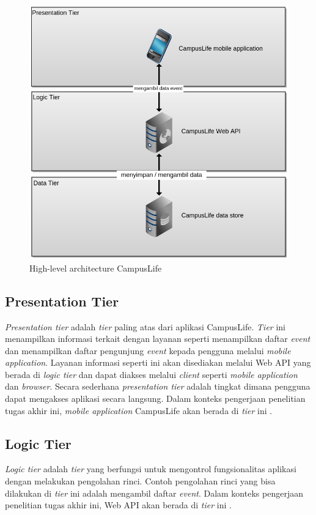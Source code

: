 \documentclass[a4paper, 12pt, oneside]{report}
\begin{document}
\begin{figure}[htp]
\centering
\includegraphics[scale=0.40]{images/test.png}
\caption{High-level architecture CampusLife}
\label{high-level-architecture-cl}
\end{figure}

\subsection{Presentation Tier}
\onehalfspacing \textit{Presentation tier} adalah \textit{tier} paling atas dari aplikasi CampusLife. \textit{Tier} ini menampilkan informasi terkait dengan layanan seperti menampilkan daftar \textit{event} dan menampilkan daftar pengunjung \textit{event} kepada pengguna melalui \textit{mobile application}. Layanan informasi seperti ini akan disediakan melalui Web API yang berada di \textit{logic tier} dan dapat diakses melalui \textit{client} seperti \textit{mobile application} dan \textit{browser}. Secara sederhana \textit{presentation tier} adalah tingkat dimana pengguna dapat mengakses aplikasi secara langsung. Dalam konteks pengerjaan penelitian tugas akhir ini, \textit{mobile application} CampusLife akan berada di \textit{tier} ini \cite{multitier-architecture-wikipedia}.

\subsection{Logic Tier}
\onehalfspacing \textit{Logic tier} adalah \textit{tier} yang berfungsi untuk mengontrol fungsionalitas aplikasi dengan melakukan pengolahan rinci. Contoh pengolahan rinci yang bisa dilakukan di \textit{tier} ini adalah mengambil daftar \textit{event}. Dalam konteks pengerjaan penelitian tugas akhir ini, Web API akan berada di \textit{tier} ini \cite{multitier-architecture-wikipedia}.
\end{document}
